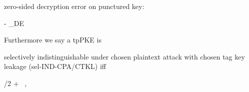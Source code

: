 \begin{definition}
\begin{sitemize}
        \item zero-sided decryption error on punctured key:
        \begin{bralign}
             - \alpha_{\textsf{DE}}\parr{\secpar}
        \end{bralign}
    \end{sitemize}
    Furthermore we say a tpPKE is
    \begin{sitemize}
        \item selectively indistinguishable under chosen plaintext attack with chosen tag key leakage (sel-IND-CPA/CTKL) iff
        \begin{bralign}
            /2 + \varepsilon\parr{\secpar}
            \ ,
        \end{bralign}


\end{sitemize}
\end{definition}
